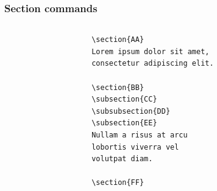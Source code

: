 \begin{frame}[fragile]
    \frametitle{Section commands}

    \begin{columns}
        \begin{column}{0.5\textwidth}
            \begin{codebox}
                \begin{verbatim}
                    \section{AA}
                    Lorem ipsum dolor sit amet,
                    consectetur adipiscing elit.
                    
                    \section{BB}
                    \subsection{CC}
                    \subsubsection{DD}
                    \subsection{EE}
                    Nullam a risus at arcu
                    lobortis viverra vel
                    volutpat diam.
                    
                    \section{FF}

\end{verbatim}
\end{codebox}
\end{column}
\end{columns}
\end{frame}

